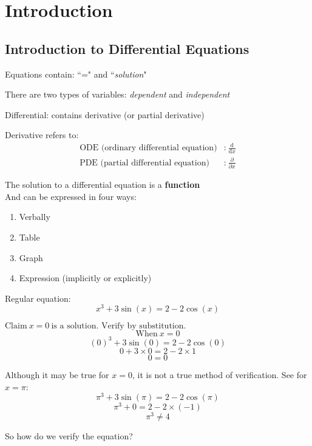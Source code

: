 \documentclass{article}
\begin{document}
\newpage
    \tableofcontents
\newpage

\section{Introduction}

\subsection{Introduction to Differential Equations}

Equations contain: ``=" and ``\textit{solution}"

There are two types of variables: \textit{dependent} and \textit{independent}

Differential: contains derivative (or partial derivative)

Derivative refers to:
\begin{align*}
    \text{ODE (ordinary differential equation)} & \text{:}\ \frac{ \text{d} }{ \text{d}x } \\
    \text{PDE (partial differential equation)} & \text{:}\ \frac{ \partial }{ \partial x }
\end{align*}

The solution to a differential equation is a \textbf{function} \\
And can be expressed in four ways:
\begin{enumerate}
    \item Verbally
    \item Table
    \item Graph
    \item Expression (implicitly or explicitly)
\end{enumerate}

Regular equation:
$$ x^{3} + 3 \sin(x) = 2 - 2 \cos(x) $$

$ \text{Claim}\ x = 0\ \text{is a solution. Verify by substitution.} $
$$ \text{When}\ x = 0 $$
$$ \left( 0 \right)^{3} + 3 \sin(0) = 2 - 2 \cos(0) $$
$$ 0 + 3 \times 0 = 2 - 2 \times 1 $$
$$ 0 = 0 $$

Although it may be true for $ x = 0 $, it is not a true method of verification. See for $ x = \pi $:
$$ \pi ^{3} + 3 \sin(\pi) = 2 - 2 \cos(\pi) $$
$$ \pi ^{3} + 0 = 2 - 2 \times \left( -1 \right) $$
$$ \pi ^{3} \neq 4 $$

So how do we verify the equation?
\end{document}
